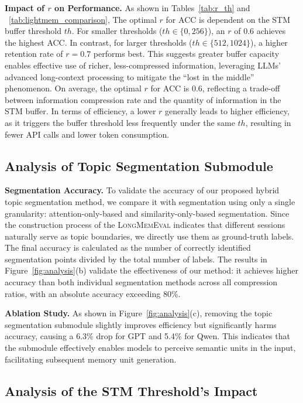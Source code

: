 \noindent \textbf{Impact of $r$ on Performance.}
As shown in Tables~\ref{tab:r_th} and ~\ref{tab:lightmem_comparison}, The optimal $r$ for ACC is dependent on the STM buffer threshold $th$. 
For smaller thresholds ($th \in \{0, 256\}$), an $r$ of 0.6 achieves the highest ACC. 
In contrast, for larger thresholds ($th \in \{512, 1024\}$), a higher retention rate of $r=0.7$ performs best. 
This suggests greater buffer capacity enables effective use of richer, less-compressed information, leveraging LLMs' advanced long-context processing to mitigate the ``lost in the middle'' phenomenon.
On average, the optimal $r$ for ACC is 0.6, reflecting a trade-off between information compression rate and the quantity of information in the STM buffer.
In terms of efficiency, a lower $r$ generally leads to higher efficiency, as it triggers the buffer threshold less frequently under the same $th$, resulting in fewer API calls and lower token consumption.

\subsection{Analysis of Topic Segmentation Submodule}
\noindent \textbf{Segmentation Accuracy.}
To validate the accuracy of our proposed hybrid topic segmentation method, we compare it with segmentation using only a single granularity: attention-only-based and similarity-only-based segmentation. 
Since the construction process of the \textsc{LongMemEval} indicates that different sessions naturally serve as topic boundaries, we directly use them as ground-truth labels. 
The final accuracy is calculated as the number of correctly identified segmentation points divided by the total number of labels. 
The results in Figure~\ref{fig:analysis}(b) validate the effectiveness of our method: it achieves higher accuracy than both individual segmentation methods across all compression ratios, with an absolute accuracy exceeding 80\%.

\noindent \textbf{Ablation Study.}
As shown in Figure~\ref{fig:analysis}(c), removing the topic segmentation submodule slightly improves efficiency but significantly harms accuracy, causing a 6.3\% drop for GPT and 5.4\% for Qwen. 
This indicates that the submodule effectively enables models to perceive semantic units in the input, facilitating subsequent memory unit generation. 

\subsection{Analysis of the STM Threshold's Impact}

